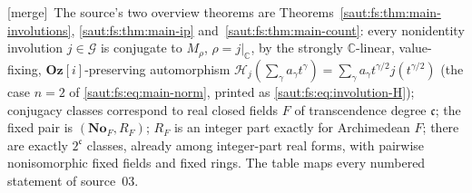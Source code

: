 \documentclass[11pt]{article}
\theoremstyle{definition}
\theoremstyle{remark}
\newcommand{\No}{\mathbf{No}}
\newcommand{\C}{\mathbb C}
\newcommand{\Oz}{\mathbf{Oz}}
\newcommand{\cc}{\mathfrak c}
\newcommand{\mergetag}{\textup{[merge]}}
\numberwithin{equation}{section}
\begin{document}
\mergetag\ The source's two overview theorems are
Theorems~\ref{saut:fs:thm:main-involutions}, \ref{saut:fs:thm:main-ip}
and~\ref{saut:fs:thm:main-count}: every nonidentity involution $j\in\mathcal G$ is
conjugate to $M_\rho$, $\rho=j|_\C$, by the strongly $\C$-linear, value-fixing,
$\Oz[i]$-preserving automorphism $\mathcal H_j(\sum_\gamma a_\gamma t^\gamma)=\sum_\gamma
a_\gamma t^{\gamma/2}j(t^{\gamma/2})$ (the case $n=2$ of \eqref{saut:fs:eq:main-norm},
printed as \eqref{saut:fs:eq:involution-H}); conjugacy classes correspond to real
closed fields $F$ of transcendence degree $\cc$; the fixed pair is $(\No_F,R_F)$; $R_F$
is an integer part exactly for Archimedean $F$; there are exactly $2^{\cc}$ classes,
already among integer-part real forms, with pairwise nonisomorphic fixed fields and
fixed rings. The table maps every numbered statement of source~03.
\end{document}
